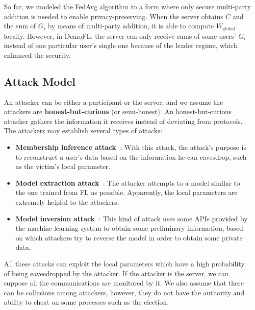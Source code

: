 So far, we modeled the FedAvg algorithm to a form where only secure multi-party addition is needed to enable privacy-preserving. When the server obtains $C$ and the sum of $G_i$ by means of multi-party addition, it is able to compute $W_\textrm{global}$ locally. However, in DemoFL, the server can only receive sums of some users' $G_i$ instead of one particular user's single one because of the leader regime, which enhanced the security.

\subsection{Attack Model}
An attacker can be either a participant or the server, and we assume the attackers are \textbf{honest-but-curious} (or semi-honest). An honest-but-curious attacker gathers the information it receives instead of deviating from protocols. The attackers may establish several types of attacks:

\begin{itemize}
    \item \textbf{Membership inference attack~\cite{Shokri17}}: With this attack, the attack's purpose is to reconstruct a user's data based on the information he can eavesdrop, such as the victim's local parameter.

    \item \textbf{Model extraction attack~\cite{Tramer16}}: The attacker attempts to a model similar to the one trained from FL as possible. Apparently, the local parameters are extremely helpful to the attackers.

    \item \textbf{Model inversion attack~\cite{Fredrikson15}}: This kind of attack uses some APIs provided by the machine learning system to obtain some preliminary information, based on which attackers try to reverse the model in order to obtain some private data.

\end{itemize}

All these attacks can exploit the local parameters which have a high probability of being eavesdropped by the attacker. If the attacker is the server, we can suppose all the communications are monitored by it. We also assume that there can be collusions among attackers, however, they do not have the authority and ability to cheat on some processes such as the election.


